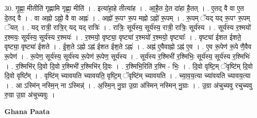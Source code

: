 \documentclass[17pt]{extarticle}
\begin{document}
30. गृ॒ह्णा॒ मीतीति॑ गृह्णामि गृह्णा॒ मीति॑ । . इत्या॑हा॒हे तीत्या॑ह । . आ॒है॒त दे॒त दा॑हा है॒तत् । . ए॒तद् वै वा ए॒त दे॒तद् वै । . वा अह्नो ऽह्नो॒ वै वा अह्नः॑ । . अह्नो॑ रू॒पꣳ रू॒प मह्नो ऽह्नो॑ रू॒पम् । . रू॒पम् ॅयद् यद् रू॒पꣳ रू॒पम् ॅयत् । . यद् रात्री॒ रात्रि॒र् यद् यद् रात्रिः॑ । . रात्रिः॒ सूर्य॑स्य॒ सूर्य॑स्य॒ रात्री॒ रात्रिः॒ सूर्य॑स्य । . सूर्य॑स्य र॒श्मयो॑ र॒श्मयः॒ सूर्य॑स्य॒ सूर्य॑स्य र॒श्मयः॑ । . र॒श्मयो॒ वृष्ट्या॒ वृष्ट्या॑ र॒श्मयो॑ र॒श्मयो॒ वृष्ट्याः᳚ । . वृष्ट्या॑ ईशत ईशते॒ वृष्ट्या॒ वृष्ट्या॑ ईशते । . ई॒श॒ते ऽह्नो ऽह्न॑ ईशत ईश॒ते ऽह्नः॑ । . अह्न॑ ए॒वैवाह्नो ऽह्न॑ ए॒व । . ए॒व रू॒पेण॑ रू॒पे णै॒वैव रू॒पेण॑ । . रू॒पेण॒ सूर्य॑स्य॒ सूर्य॑स्य रू॒पेण॑ रू॒पेण॒ सूर्य॑स्य । . सूर्य॑स्य र॒श्मिभी॑ र॒श्मिभिः॒ सूर्य॑स्य॒ सूर्य॑स्य र॒श्मिभिः॑ । . र॒श्मिभि॑र् दि॒वो दि॒वो र॒श्मिभी॑ र॒श्मिभि॑र् दि॒वः । . र॒श्मिभि॒रिति॑ र॒श्मि - भिः॒ । . दि॒वो वृष्टि॒म् ॅवृष्टि॑म् दि॒वो दि॒वो वृष्टि᳚म् । . वृष्टि॑म् च्यावयति च्यावयति॒ वृष्टि॒म् ॅवृष्टि॑म् च्यावयति । . च्या॒व॒य॒त्या च्या॑वयति च्यावय॒त्या । . आ ऽस्मि॑न् नस्मि॒न् ना ऽस्मिन्न्॑ । . अ॒स्मि॒न् नु॒ग्रा उ॒ग्रा अ॑स्मिन् नस्मिन् नु॒ग्राः । . उ॒ग्रा अ॑चुच्यवु रचुच्यवु रु॒ग्रा उ॒ग्रा अ॑चुच्यवुः । \newline

\textbf{Ghana Paata } \newline
\end{document}
